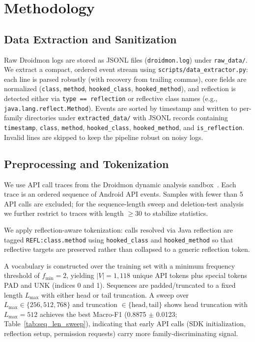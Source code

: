 \documentclass[12pt]{report}
\begin{document}
\section{Methodology}

\subsection{Data Extraction and Sanitization}
Raw Droidmon logs are stored as JSONL files (\texttt{droidmon.log}) under
\texttt{raw\_data/}. We extract a compact, ordered event stream using
\texttt{scripts/data\_extractor.py}: each line is parsed robustly (with recovery
from trailing commas), core fields are normalized (\texttt{class},
\texttt{method}, \texttt{hooked\_class}, \texttt{hooked\_method}), and
reflection is detected either via \texttt{type == reflection} or reflective
class names (e.g., \texttt{java.lang.reflect.Method}). Events are sorted by
timestamp and written to per-family directories under \texttt{extracted\_data/}
with JSONL records containing \texttt{timestamp}, \texttt{class},
\texttt{method}, \texttt{hooked\_class}, \texttt{hooked\_method}, and
\texttt{is\_reflection}. Invalid lines are skipped to keep the pipeline robust
on noisy logs.

\subsection{Preprocessing and Tokenization}
We use API call traces from the Droidmon dynamic analysis
sandbox~\citep{droidmon}. Each trace is an ordered sequence of Android API
events. Samples with fewer than 5 API calls are excluded; for the
sequence-length sweep and deletion-test analysis we further restrict to
traces with length $\geq 30$ to stabilize statistics.

We apply reflection-aware tokenization: calls resolved via Java reflection
are tagged \texttt{REFL:class.method} using \texttt{hooked\_class} and
\texttt{hooked\_method} so that reflective targets are preserved rather than
collapsed to a generic reflection token.

A vocabulary is constructed over the training set with a minimum
frequency threshold of $f_{\min}=2$, yielding $|V|=1{,}118$ unique
API tokens plus special tokens PAD and UNK (indices 0 and 1). Sequences
are padded/truncated to a fixed length $L_{\max}$ with either head or tail
truncation. A sweep over $L_{\max}\in\{256, 512, 768\}$ and truncation
$\in\{\text{head},\text{tail}\}$ shows head truncation with $L_{\max}=512$
achieves the best Macro-F1 (0.8875 $\pm$ 0.0123;
Table~\ref{tab:seq_len_sweep}), indicating that early API calls (SDK
initialization, reflection setup, permission requests) carry more
family-discriminating signal.
\end{document}
